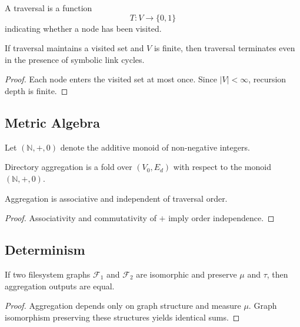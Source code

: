\begin{definition}
A traversal is a function
\[
T : V \to \{0,1\}
\]
indicating whether a node has been visited.
\end{definition}

\begin{proposition}[Termination]
If traversal maintains a visited set and $V$ is finite, then traversal terminates even in the presence of symbolic link cycles.
\end{proposition}

\begin{proof}
Each node enters the visited set at most once.
Since $|V|<\infty$, recursion depth is finite.
\end{proof}

\subsection*{Metric Algebra}

Let $(\mathbb{N}, +, 0)$ denote the additive monoid of non-negative integers.

\begin{definition}
Directory aggregation is a fold over $(V_0,E_d)$ with respect to the monoid $(\mathbb{N}, +, 0)$.
\end{definition}

\begin{proposition}
Aggregation is associative and independent of traversal order.
\end{proposition}

\begin{proof}
Associativity and commutativity of $+$ imply order independence.
\end{proof}

\subsection*{Determinism}

\begin{theorem}
If two filesystem graphs $\mathcal{F}_1$ and $\mathcal{F}_2$ are isomorphic
and preserve $\mu$ and $\tau$, then aggregation outputs are equal.
\end{theorem}

\begin{proof}
Aggregation depends only on graph structure and measure $\mu$.
Graph isomorphism preserving these structures yields identical sums.
\end{proof}

